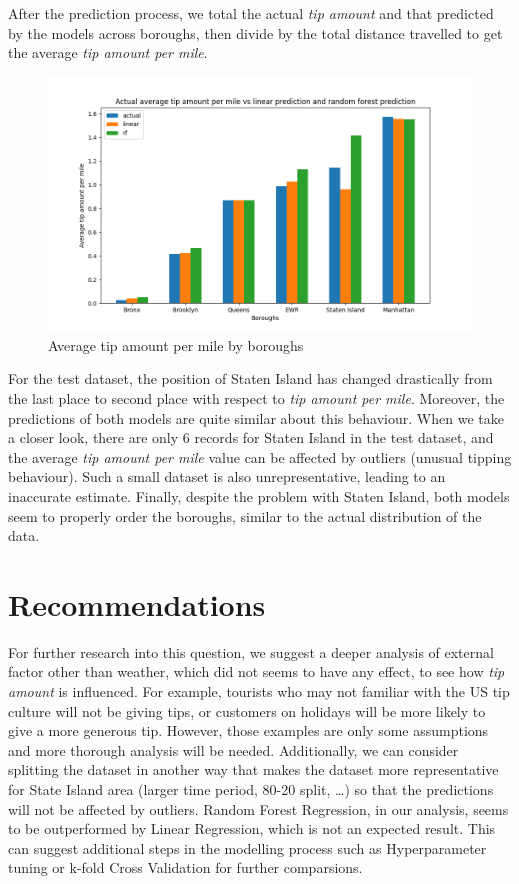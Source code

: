 \documentclass[11pt]{article}
\begin{document}
After the prediction process, we total the actual \textit{tip amount} and that predicted by the models across boroughs, then divide by the total distance travelled to get the average \textit{tip amount per mile}.

\begin{figure}[h]
    \centering
    \includegraphics[width=0.7\linewidth]{plots/bar_chart_tip_per_mile_amount.png}
    \caption{Average tip amount per mile by boroughs}
\end{figure}

For the test dataset, the position of Staten Island has changed drastically from the last place to second place with respect to \textit{tip amount per mile}. Moreover, the predictions of both models are quite similar about this behaviour. When we take a closer look, there are only 6 records for Staten Island in the test dataset, and the average \textit{tip amount per mile} value can be affected by outliers (unusual tipping behaviour). Such a small dataset is also unrepresentative, leading to an inaccurate estimate. Finally, despite the problem with Staten Island, both models seem to properly order the boroughs, similar to the actual distribution of the data.

\section{Recommendations}

For further research into this question, we suggest a deeper analysis of external factor other than weather, which did not seems to have any effect, to see how \textit{tip amount} is influenced. For example, tourists who may not familiar with the US tip culture will not be giving tips, or customers on holidays will be more likely to give a more generous tip. However, those examples are only some assumptions and more thorough analysis will be needed. Additionally, we can consider splitting the dataset in another way that makes the dataset more representative for State Island area (larger time period, 80-20 split, …) so that the predictions will not be affected by outliers. Random Forest Regression, in our analysis, seems to be outperformed by Linear Regression, which is not an expected result. This can suggest additional steps in the modelling process such as Hyperparameter tuning or k-fold Cross Validation for further comparsions.
\end{document}
